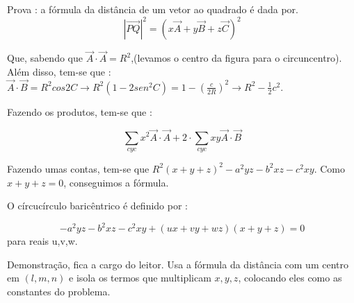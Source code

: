 \documentclass{article}
\begin{document}
Prova : a fórmula da distância de um vetor ao quadrado é dada por.
$$
|\overrightarrow{PQ}|^2 = (x \overrightarrow{A} + y \overrightarrow{B} + z \overrightarrow{C})^2
$$
\begin{center}
\end{center}
Que, sabendo que $\overrightarrow{A} \cdot \overrightarrow{A} = R^2$,(levamos o centro da figura para o circuncentro). Além disso, tem-se que : $\overrightarrow{A} \cdot \overrightarrow{B} = R^2 cos2C \xrightarrow{} R^2(1-2sen^2C) = 1 - (\frac{c}{2R})^2 \xrightarrow{} R^2 - \frac{1}{2} c^2$. 

Fazendo os produtos,  tem-se que : 

$$
\sum_{cyc} x^2 \overrightarrow{A} \cdot \overrightarrow{A} + 2 \cdot \sum_{cyc} xy \overrightarrow{A} \cdot \overrightarrow{B}
$$

Fazendo umas contas, tem-se que $R^2(x+y+z)^2 - a^2yz - b^2xz - c^2xy$. Como $x+y+z = 0$, conseguimos a fórmula.

\begin{tcolorbox}[colback=green!5!white,colframe=green!75!black,title=Circuncírculo baricêntrico\emoji{goblin}]

O círcucírculo baricêntrico é definido por :

$$
-a^2yz - b^2xz - c^2xy + (ux + vy + wz)(x+y+z) = 0
$$
para reais u,v,w.
\end{tcolorbox}

Demonstração, fica a cargo do leitor. Usa a fórmula da distância com um centro em $(l,m,n)$ e isola os termos que multiplicam $x,y,z$, colocando eles como as constantes do problema.
\end{document}
